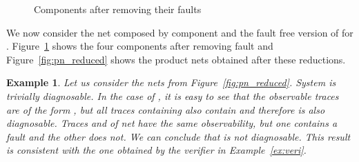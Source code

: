 \documentclass[a4paper]{article}
\newtheorem{exmp}{Example}
\begin{document}
\begin{figure}[h]
{{ }}
   \caption{Components after removing their faults}
   \label{fig:reduced}
 \end{figure}

We now consider the net  composed by component  and the fault free version of  for . Figure~\ref{fig:reduced} shows the four components after removing fault  and Figure~\ref{fig:pn_reduced} shows the product nets obtained after these reductions.

\begin{exmp}
  Let us consider the nets from Figure~\ref{fig:pn_reduced}. System  is trivially diagnosable. In the case of , it is easy to see that the observable traces are of the form , but all traces containing  also contain  and therefore  is also diagnosable. Traces  and  of net  have the same observability, but one contains a fault and the other does not. We can conclude that  is not diagnosable. This result is consistent with the one obtained by the verifier in Example~\ref{ex:veri}.
  \label{ex:two}
\end{exmp}
\end{document}
